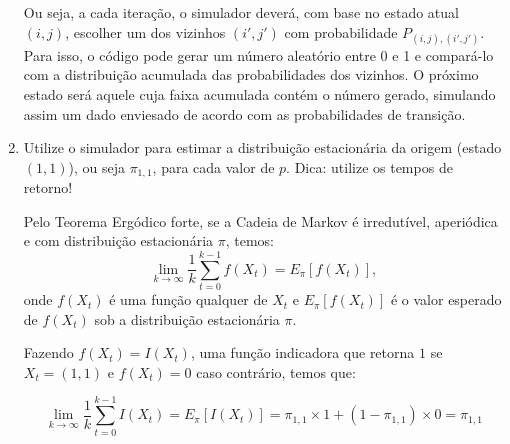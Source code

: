 \begin{enumerate}
\begin{resposta}
    Ou seja, a cada iteração, o simulador deverá, com base no estado atual $(i, j)$, escolher um dos vizinhos $(i', j')$ com probabilidade $P_{(i,j),(i',j')}$. Para isso, o código pode gerar um número aleatório entre 0 e 1 e compará-lo com a distribuição acumulada das probabilidades dos vizinhos. O próximo estado será aquele cuja faixa acumulada contém o número gerado, simulando assim um dado enviesado de acordo com as probabilidades de transição.

    \begin{center}\end{center}

    \end{resposta}

    \item Utilize o simulador para estimar a distribuição estacionária da origem (estado $(1,1)$), ou seja $\pi_{1,1}$, para cada valor de $p$. Dica: utilize os tempos de retorno!
    \begin{resposta}
        Pelo Teorema Ergódico forte, se a Cadeia de Markov é irredutível, aperiódica e com distribuição estacionária $\pi$, temos:
        $$\lim_{k \to \infty} \frac{1}{k} \sum_{t=0}^{k-1} f(X_t) = E_\pi [f(X_t)],$$
        onde $f(X_t)$ é uma função qualquer de $X_t$ e $E_\pi [f(X_t)]$ é o valor esperado de $f(X_t)$ sob a distribuição estacionária $\pi$.

        Fazendo $f(X_t) = I(X_t)$, uma função indicadora que retorna $1$ se $X_t = (1,1)$ e $f(X_t) = 0$ caso contrário, temos que:
        
        $$\lim_{k \to \infty} \frac{1}{k} \sum_{t=0}^{k-1} I(X_t) = E_\pi [I(X_t)] = \pi_{1,1}\times1 + (1-\pi_{1,1})\times0 = \pi_{1,1}$$


\end{resposta}
\end{enumerate}
